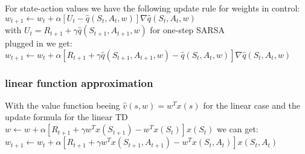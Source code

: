 \documentclass[11pt,a4paper]{article}
\begin{document}
For state-action values we have the following update rule for weights in control:
\vspace{10pt}
\flushleft
$w_{t+1} \leftarrow w_{t} + \alpha [U_{t} - \hat{q}(S_t,A_t,w)]\nabla\hat{q}(S_t,A_t,w)$\\
with $U_t = R_{t+1}+\gamma \hat{q} (S_{t+1},A_{t+1},w)$ for one-step SARSA\\
\vspace{10pt}
plugged in we get: $w_{t+1} \leftarrow w_{t} + \alpha [R_{t+1}+\gamma \hat{q} (S_{t+1},A_{t+1},w) - \hat{q}(S_t,A_t,w)]\nabla\hat{q}(S_t,A_t,w)$

\subsubsection{linear function approximation}

With the value function beeing $\hat{v}(s,w)=w^T x(s)$ for the linear case and the update formula
for the linear TD $w \leftarrow w + \alpha [R_{t+1}+\gamma w^T x(S_{t+1}) - w^T x(S_t)]x(S_t)$ we can get:\\
\vspace{10pt}
\flushleft
$w_{t+1} \leftarrow w_{t} + \alpha [R_{t+1}+\gamma w^T x(S_{t+1},A_{t+1}) - w^T x(S_t,A_t)]x(S_t,A_t)$
\end{document}
